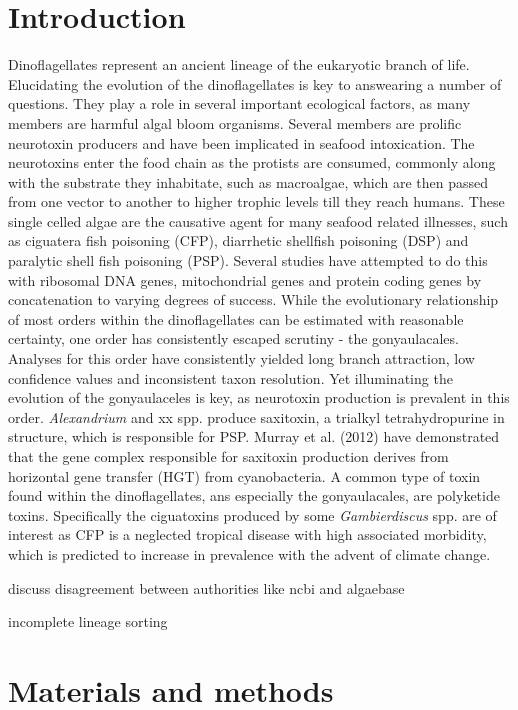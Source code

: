 \documentclass[12pt]{article}
\begin{document}
\section{Introduction}
Dinoflagellates represent an ancient lineage of the eukaryotic branch of life. Elucidating the evolution of the dinoflagellates is key to answearing a number of questions. They play a role in several important ecological factors, as many members are harmful algal bloom organisms. Several members are prolific neurotoxin producers and have been implicated in seafood intoxication. The neurotoxins enter the food chain as the protists are consumed, commonly along with the substrate they inhabitate, such as macroalgae, which are then passed from one vector to another to higher trophic levels till they reach humans. These single celled algae are the causative agent for many seafood related illnesses, such as ciguatera fish poisoning (CFP), diarrhetic shellfish poisoning (DSP) and paralytic shell fish poisoning (PSP).
Several studies have attempted to do this with ribosomal DNA genes, mitochondrial genes and protein coding genes by concatenation to varying degrees of success. While the evolutionary relationship of most orders within the dinoflagellates can be estimated with reasonable certainty, one order has consistently escaped scrutiny - the gonyaulacales. Analyses for this order have consistently yielded long branch attraction, low confidence values and inconsistent taxon resolution. Yet illuminating the evolution of the gonyaulaceles is key, as neurotoxin production is prevalent in this order. 
\emph{Alexandrium} and xx spp. produce saxitoxin, a trialkyl tetrahydropurine in structure, which is responsible for PSP. Murray et al. (2012) have demonstrated that the gene complex responsible for saxitoxin production derives from horizontal gene transfer (HGT) from cyanobacteria.
A common type of toxin found within the dinoflagellates, ans especially the gonyaulacales, are polyketide toxins. Specifically the ciguatoxins produced by some \emph{Gambierdiscus} spp. are of interest as CFP is a neglected tropical disease with high associated morbidity, which is predicted to increase in prevalence with the advent of climate change.

discuss disagreement between authorities like ncbi and algaebase

incomplete lineage sorting 
\newpage

\section{Materials and methods}
\end{document}
